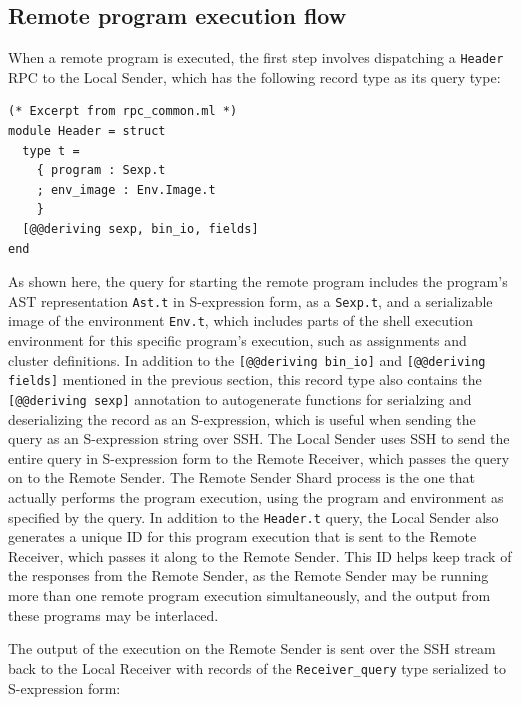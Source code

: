 \documentclass[twoside]{report}
\begin{document}
\subsection{Remote program execution flow}

When a remote program is executed, the first step involves dispatching a \texttt{Header} RPC to the Local Sender, which has the following record type as its query type:

\begin{minipage}[c]{\textwidth-15pt}
  \begin{lstlisting}
(* Excerpt from rpc_common.ml *)
module Header = struct
  type t =
    { program : Sexp.t
    ; env_image : Env.Image.t
    }
  [@@deriving sexp, bin_io, fields]
end
\end{lstlisting}
  \smallskip
\end{minipage}

As shown here, the query for starting the remote program includes the program's AST representation \texttt{Ast.t} in S-expression form, as a \texttt{Sexp.t}, and a serializable image of the environment \texttt{Env.t}, which includes parts of the shell execution environment for this specific program's execution, such as assignments and cluster definitions.
In addition to the \texttt{[@@deriving bin\_io]} and \texttt{[@@deriving fields]} mentioned in the previous section, this record type also contains the \texttt{[@@deriving sexp]} annotation to autogenerate functions for serialzing and deserializing the record as an S-expression, which is useful when sending the query as an S-expression string over SSH.
The Local Sender uses SSH to send the entire query in S-expression form to the Remote Receiver, which passes the query on to the Remote Sender.
The Remote Sender Shard process is the one that actually performs the program execution, using the program and environment as specified by the query.
In addition to the \texttt{Header.t} query, the Local Sender also generates a unique ID for this program execution that is sent to the Remote Receiver, which passes it along to the Remote Sender.
This ID helps keep track of the responses from the Remote Sender, as the Remote Sender may be running more than one remote program execution simultaneously, and the output from these programs may be interlaced.

The output of the execution on the Remote Sender is sent over the SSH stream back to the Local Receiver with records of the \texttt{Receiver\_query} type serialized to S-expression form:
\end{document}
